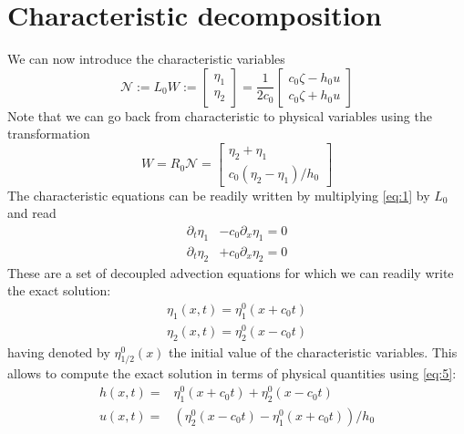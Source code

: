 \documentclass[10pt]{article}
\begin{document}
 \section{Characteristic decomposition}
 We can now introduce the characteristic variables
\begin{equation}\label{eq:4}
\mathcal{N}:=   L_0W := \left[\begin{array}{c}  \eta_1 \\  \eta_2
\end{array}\right]= \dfrac{1}{2c_0}\left[\begin{array}{c}  c_0 \zeta - h_0 u\\  c_0 \zeta + h_0 u
\end{array}\right]
\end{equation} 
Note that we can go back from characteristic to physical variables using the transformation
\begin{equation}\label{eq:5}
W=R_0\mathcal{N}=\left[\begin{array}{c}  \eta_2+\eta_1  \\ c_0(\eta_2-\eta_1)/h_0 
\end{array}\right]
\end{equation} 
The characteristic   equations can be readily written by multiplying \eqref{eq:1} by $L_0$ and read
\begin{equation}\label{eq:6}
\begin{split}
\partial_t  \eta_1 &- c_0 \partial_x  \eta_1   =0\\
\partial_t  \eta_2 &+ c_0 \partial_x  \eta_2  =0
\end{split}
\end{equation}
These are a set of decoupled advection equations for which we can readily write the exact solution:
\begin{equation}\label{eq:6a}
\begin{split}
\eta_1(x,t)=\eta_1^0(x+c_0t)\\
\eta_2(x,t)=\eta_2^0(x-c_0t)
\end{split}
\end{equation}
having denoted by $\eta^0_{1/2}(x)$ the initial value of the characteristic variables.
This  allows  to compute the exact solution in terms of physical quantities using \eqref{eq:5}:
\begin{equation}\label{eq:7}
\begin{split}
h(x,t) = &\eta_1^0(x+c_0t)+\eta_2^0(x-c_0t)\\
u(x,t) = &(\eta_2^0(x-c_0t)-\eta_1^0(x+c_0t))/h_0
\end{split}
\end{equation}
\end{document}
